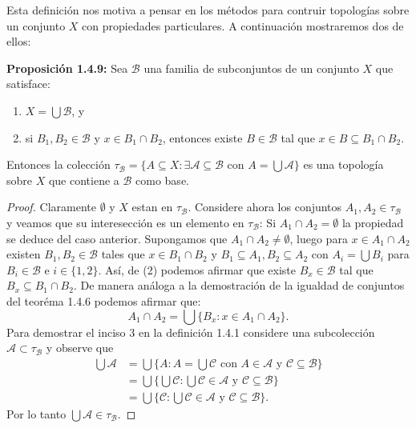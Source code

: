 Esta definición nos motiva a pensar en los métodos para contruir topologías sobre un conjunto $X$ con propiedades particulares. A continuación mostraremos dos de ellos:

\textbf{Proposición 1.4.9:} Sea $\mathcal{B}$ una familia de subconjuntos de un conjunto $X$ que satisface:
\begin{enumerate}
    \item $X=\bigcup \mathcal{B}$, y 
    \item si $B_1,B_2\in\mathcal{B}$ y $x\in B_1\cap B_2$, entonces existe $B\in\mathcal{B}$ tal que $x\in B\subseteq B_1\cap B_2$.
\end{enumerate}
Entonces la colección $\tau_\mathcal{B}=\{A\subseteq X:\exists\mathcal{A}\subseteq\mathcal{B}\text{ con }A=\bigcup\mathcal{A}\}$ es una topología sobre $X$ que contiene a $\mathcal{B}$ como base.
\begin{proof}
Claramente $\emptyset$ y $X$ estan en $\tau_\mathcal{B}$. Considere ahora los conjuntos $A_1,A_2\in\tau_\mathcal{B}$ y veamos que su interesección es un elemento en $\tau_\mathcal{B}$: Si $A_1\cap A_2=\emptyset$ la propiedad se deduce del caso anterior. Supongamos que $A_1\cap A_2\neq\emptyset$, luego para $x\in A_1\cap A_2$ existen $B_1,B_2\in\mathcal{B}$ tales que $x\in B_1\cap B_2$ y $B_1\subseteq A_1, B_2\subseteq A_2$ con $A_i=\bigcup B_i$ para $B_i\in\mathcal{B}$ e $i\in\{1,2\}$. Así, de (2) podemos afirmar que existe $B_x\in\mathcal{B}$ tal que $B_x\subseteq B_1\cap B_2$. De manera análoga a la demostración de la igualdad de conjuntos del teoréma 1.4.6 podemos afirmar que: 
$$A_1\cap A_2=\bigcup\{B_x:x\in A_1\cap A_2\}.$$
Para demostrar el inciso 3 en la definición 1.4.1 considere una subcolección $\mathcal{A}\subset\tau_\mathcal{B}$ y observe que
\begin{align*}
    \bigcup\mathcal{A} &= \bigcup\{A:A=\bigcup\mathcal{C}\text{ con }A\in\mathcal{A}\text{ y }\mathcal{C}\subseteq\mathcal{B}\}\\
    &= \bigcup\{\bigcup\mathcal{C}:\bigcup\mathcal{C}\in\mathcal{A}\text{ y }\mathcal{C}\subseteq\mathcal{B}\}\\
    &= \bigcup\{\mathcal{C}:\bigcup\mathcal{C}\in\mathcal{A}\text{ y }\mathcal{C}\subseteq\mathcal{B}\}.
\end{align*}
Por lo tanto $\bigcup\mathcal{A}\in\tau_\mathcal{B}$.
\end{proof}

